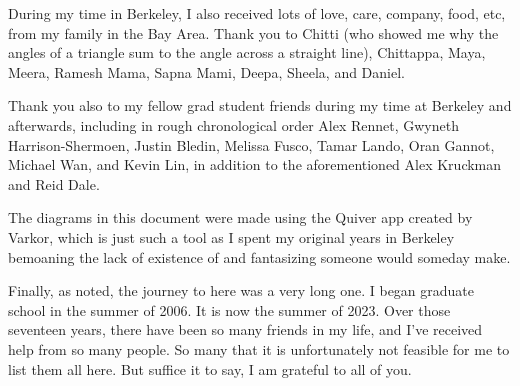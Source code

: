 \documentclass{ucbthesis}
\newcommand{\topLevelCounter}{chapter}
\begin{document}
\begin{frontmatter}
\begin{acknowledgements}
During my time in Berkeley, I also received lots of love, care, company, food, etc, from my family in the Bay Area. Thank you to Chitti (who showed me why the angles of a triangle sum to the angle across a straight line), Chittappa, Maya, Meera, Ramesh Mama, Sapna Mami, Deepa, Sheela, and Daniel.

Thank you also to my fellow grad student friends during my time at Berkeley and afterwards, including in rough chronological order Alex Rennet, Gwyneth Harrison-Shermoen, Justin Bledin, Melissa Fusco, Tamar Lando, Oran Gannot, Michael Wan, and Kevin Lin, in addition to the aforementioned Alex Kruckman and Reid Dale.

The diagrams in this document were made using the Quiver app created by Varkor, which is just such a tool as I spent my original years in Berkeley bemoaning the lack of existence of and fantasizing someone would someday make.

Finally, as noted, the journey to here was a very long one. I began graduate school in the summer of 2006. It is now the summer of 2023. Over those seventeen years, there have been so many friends in my life, and I've received help from so many people. So many that it is unfortunately not feasible for me to list them all here. But suffice it to say, I am grateful to all of you.
\end{acknowledgements}

\tableofcontents

\end{frontmatter}

\setcounter{\topLevelCounter}{-1}








\printbibliography



% 
\end{document}
